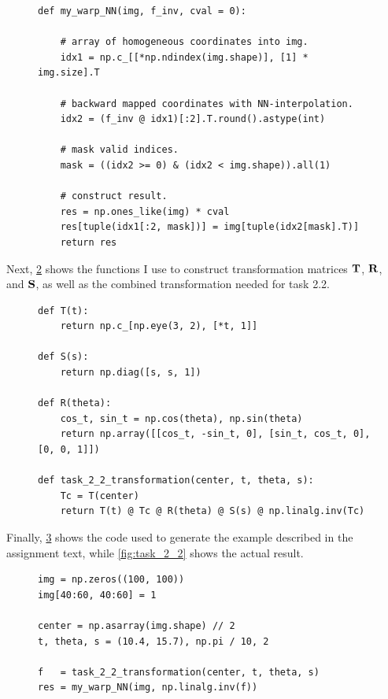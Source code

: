 \begin{figure}[H]
  \centering
  \begin{verbatim}
def my_warp_NN(img, f_inv, cval = 0):

    # array of homogeneous coordinates into img.
    idx1 = np.c_[[*np.ndindex(img.shape)], [1] * img.size].T

    # backward mapped coordinates with NN-interpolation.
    idx2 = (f_inv @ idx1)[:2].T.round().astype(int)

    # mask valid indices.
    mask = ((idx2 >= 0) & (idx2 < img.shape)).all(1)

    # construct result.
    res = np.ones_like(img) * cval
    res[tuple(idx1[:2, mask])] = img[tuple(idx2[mask].T)]
    return res
  \end{verbatim}
  \label{code:my_warp_NN}
\end{figure}

Next, \cref{code:transformations} shows the functions I use to construct
transformation matrices $\mathbf{T}$, $\mathbf{R}$, and $\mathbf{S}$, as well as the
combined transformation needed for task 2.2.

\begin{figure}[H]
  \centering
  \begin{verbatim}
def T(t):
    return np.c_[np.eye(3, 2), [*t, 1]]

def S(s):
    return np.diag([s, s, 1])

def R(theta):
    cos_t, sin_t = np.cos(theta), np.sin(theta)
    return np.array([[cos_t, -sin_t, 0], [sin_t, cos_t, 0], [0, 0, 1]])

def task_2_2_transformation(center, t, theta, s):
    Tc = T(center)
    return T(t) @ Tc @ R(theta) @ S(s) @ np.linalg.inv(Tc)
  \end{verbatim}
  \label{code:transformations}
\end{figure}

Finally, \cref{code:task_2_2} shows the code used to generate the example
described in the assignment text, while \cref{fig:task_2_2} shows the actual
result.
\begin{figure}[H]
  \centering
  \begin{verbatim}
img = np.zeros((100, 100))
img[40:60, 40:60] = 1

center = np.asarray(img.shape) // 2
t, theta, s = (10.4, 15.7), np.pi / 10, 2

f   = task_2_2_transformation(center, t, theta, s)
res = my_warp_NN(img, np.linalg.inv(f))
  \end{verbatim}
  \label{code:task_2_2}
\end{figure}

